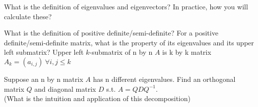\begin{exe}[Eigenvalue]
What is the definition of eigenvalues and eigenvectors? In practice, how you will calculate these?
\end{exe}
\begin{teacher}
\begin{sol}
\end{sol}
\end{teacher}

\begin{exe}
What is the definition of positive definite/semi-definite? For a positive definite/semi-definite matrix, what is the property of its eigenvalues and its upper left submatrix? Upper left $k$-submatrix of n by n $A$ is k by k matrix $A_k=(a_{i,j})\ \forall i,j\leq k$
\end{exe}
\begin{teacher}
\begin{sol}
\end{sol}
\end{teacher}

\begin{exe}[Diagonalize]
Suppose an n by n matrix $A$ has n different eigenvalues. Find an orthogonal matrix $Q$ and diagonal matrix $D$ s.t. $A=QDQ^{-1}$.\\
(What is the intuition and application of this decomposition)
\end{exe}
\begin{teacher}
\begin{sol}
\end{sol}
\end{teacher}


